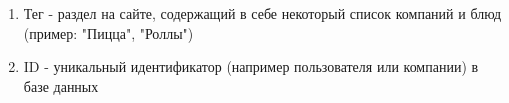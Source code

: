 \begin{enumerate}
  \item Тег - раздел на сайте, содержащий в себе некоторый список компаний и блюд
  (пример: "Пицца", "Роллы")
  \item ID - уникальный идентификатор (например пользователя или компании) в базе данных
\end{enumerate}
